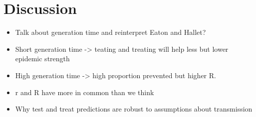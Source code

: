 \documentclass{article}\usepackage[]{graphicx}\usepackage[]{color}
\begin{document}
\section{Discussion}


\begin{itemize}
	\item Talk about generation time and reinterpret Eaton and Hallet?
	\item Short generation time -> teating and treating will help less but lower epidemic strength
	\item High generation time -> high proportion prevented but higher R.
\end{itemize}

\begin{itemize}
	\item r and R have more in common than we think
	\item Why test and treat predictions are robust to assumptions about transmission
\end{itemize}
\end{document}
